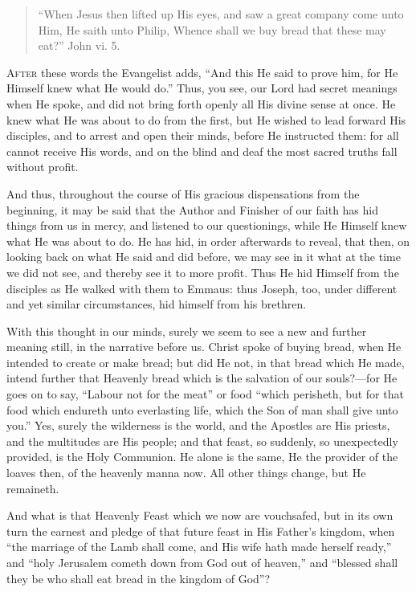 
\begin{quote}

``When Jesus then lifted up His eyes, and saw a great company
come unto Him, He saith unto Philip, Whence shall we buy bread that
these may eat?'' John vi. 5.

\end{quote}

A\textsc{fter} these words the Evangelist adds, ``And this He said to
prove him, for He Himself knew what He would do.'' Thus, you see,
our Lord had secret meanings when He spoke, and did not bring forth
openly all His divine sense at once. He knew what He was about to do
from the first, but He wished to lead forward His disciples, and to
arrest and open their minds, before He instructed them: for all cannot
receive His words, and on the blind and deaf the most sacred truths
fall without profit.

And thus, throughout the course of His gracious dispensations from
the beginning, it may be said that the Author and Finisher of our
faith has hid things from us in mercy, and listened to our
questionings, while He Himself knew what He was about to do. He has
hid, in order afterwards to reveal, that then, on looking back on what
He said and did before, we may see in it what at the time we did not
see, and thereby see it to more profit. Thus He hid Himself from the
disciples as He walked with them to Emmaus: thus Joseph, too, under
different and yet similar circumstances, hid himself from his
brethren.

With this thought in our minds, surely we seem to see a new and
further meaning still, in the narrative before us. Christ spoke of
buying bread, when He intended to create or make bread; but did He
not, in that bread which He made, intend further that Heavenly bread
which is the salvation of our souls?—for He goes on to say,
``Labour not for the meat'' or food ``which perisheth, but
for that food which endureth unto everlasting life, which the Son of
man shall give unto you.'' Yes, surely the wilderness is the
world, and the Apostles are His priests, and the multitudes are His
people; and that feast, so suddenly, so unexpectedly provided, is the
Holy Communion. He alone is the same, He the provider of the loaves
then, of the heavenly manna now. All other things change, but He
remaineth.

And what is that Heavenly Feast which we now are vouchsafed, but in
its own turn the earnest and pledge of that future feast in His
Father's kingdom, when ``the marriage of the Lamb shall come, and
His wife hath made herself ready,'' and ``holy Jerusalem
cometh down from God out of heaven,'' and ``blessed shall they
be who shall eat bread in the kingdom of God''?

